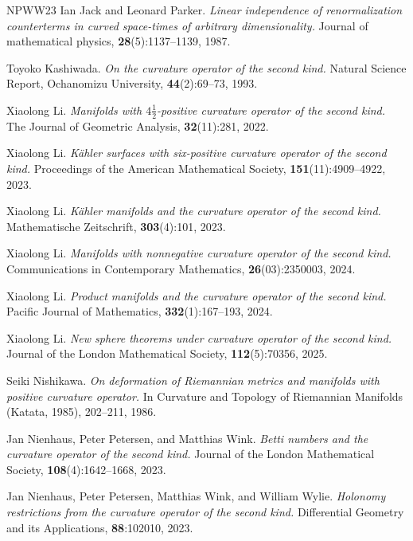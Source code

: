 \documentclass[11pt, reqno]{amsart}
\numberwithin{equation}{section}
\theoremstyle{definition}
\begin{document}
\begin{thebibliography}{NPWW23}
		Ian Jack and Leonard Parker. \emph{Linear independence of renormalization counterterms in curved
			space-times of arbitrary dimensionality.} Journal of mathematical physics, \textbf{28}(5):1137–1139, 1987.
		
		Toyoko Kashiwada. \emph{On the curvature operator of the second kind.} Natural Science Report, Ochanomizu
		University, \textbf{44}(2):69–73, 1993.
		
		Xiaolong Li. \emph{Manifolds with $4\frac{1}{2}$-positive curvature operator of the second kind.} The Journal of
		Geometric Analysis, \textbf{32}(11):281, 2022.
		
		Xiaolong Li. \emph{Kähler surfaces with six-positive curvature operator of the second kind.} Proceedings
		of the American Mathematical Society, \textbf{151}(11):4909–4922, 2023.
		
		Xiaolong Li. \emph{Kähler manifolds and the curvature operator of the second kind.} Mathematische
		Zeitschrift, \textbf{303}(4):101, 2023.
		
		Xiaolong Li. \emph{Manifolds with nonnegative curvature operator of the second kind.} Communications
		in Contemporary Mathematics, \textbf{26}(03):2350003, 2024.
		
		Xiaolong Li. \emph{Product manifolds and the curvature operator of the second kind.} Pacific Journal
		of Mathematics, \textbf{332}(1):167–193, 2024.
		
		Xiaolong Li. \emph{New sphere theorems under curvature operator of the second kind.} Journal of the
		London Mathematical Society, \textbf{112}(5):70356, 2025.
		
		Seiki Nishikawa. \emph{On deformation of Riemannian metrics and manifolds with positive curvature
			operator.} In Curvature and Topology of Riemannian Manifolds (Katata, 1985), 202–211, 1986.
		
		Jan Nienhaus, Peter Petersen, and Matthias Wink. \emph{Betti numbers and the curvature operator of
			the second kind.} Journal of the London Mathematical Society, \textbf{108}(4):1642–1668, 2023.
		
		Jan Nienhaus, Peter Petersen, Matthias Wink, and William Wylie. \emph{Holonomy restrictions from
			the curvature operator of the second kind.} Differential Geometry and its Applications, \textbf{88}:102010, 2023.
		

\end{thebibliography}
\end{document}
